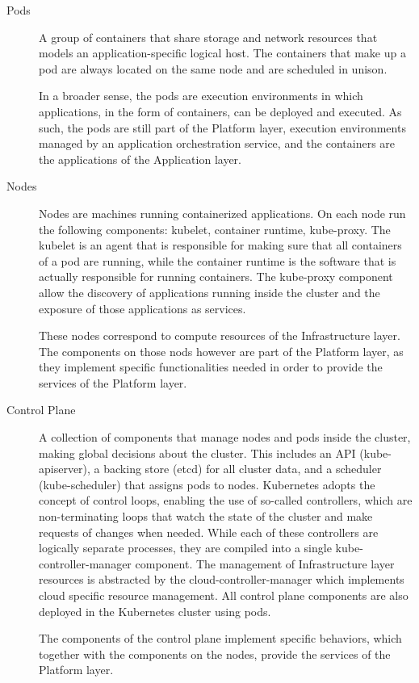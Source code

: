 \begin{description}
  \item[Pods]
    A group of containers that share storage and network resources that models
    an application-specific logical host. The containers that make up a pod are
    always located on the same node and are scheduled in unison.

    In a broader sense, the pods are execution environments in which
    applications, in the form of containers, can be deployed and executed. As
    such, the pods are still part of the Platform layer, execution environments
    managed by an application orchestration service, and the containers
    are the applications of the Application layer.

  \item[Nodes]
    Nodes are machines running containerized applications. On each node run the
    following components: kubelet, container runtime, kube-proxy. The kubelet is
    an agent that is responsible for making sure that all containers of a pod
    are running, while the container runtime is the software that is actually
    responsible for running containers. The kube-proxy component allow the
    discovery of applications running inside the cluster and the exposure of
    those applications as services.

    These nodes correspond to compute resources of the Infrastructure layer. The
    components on those nods however are part of the Platform layer, as they
    implement specific functionalities needed in order to provide the services
    of the Platform layer.

  \item[Control Plane]
    A collection of components that manage nodes and pods inside the cluster,
    making global decisions about the cluster. This includes an API
    (kube-apiserver), a backing store (etcd) for all cluster data, and a
    scheduler (kube-scheduler) that assigns pods to nodes. Kubernetes adopts the
    concept of control loops, enabling the use of so-called controllers, which
    are non-terminating loops that watch the state of the cluster and make
    requests of changes when needed. While each of these controllers are
    logically separate processes, they are compiled into a single
    kube-controller-manager component. The management of Infrastructure layer
    resources is abstracted by the cloud-controller-manager which implements
    cloud specific resource management. All control plane components are also
    deployed in the Kubernetes cluster using pods.

    The components of the control plane implement specific behaviors, which
    together with the components on the nodes, provide the services of the
    Platform layer.
\end{description}

